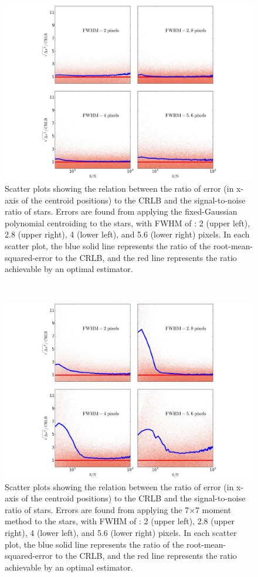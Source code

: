 \documentclass[onecolumn]{aastex61}
\newcommand{\todo}[1]{{\textcolor{dred}{ #1}}}
\begin{document}
\begin{figure}[p]~\\
\begin{center}
\includegraphics[width=0.85\linewidth]{new_polynomial.pdf}
\caption{\todo{Scatter plots showing the relation between the ratio of error (in x-axis of the centroid positions) to the CRLB and the signal-to-noise ratio of stars. 
Errors are found from applying the fixed-Gaussian polynomial centroiding to the stars,
with FWHM of : 2 (upper left), 2.8 (upper right), 4 (lower left), and 5.6 (lower right) pixels. In each scatter plot, the blue solid line represents the ratio of the root-mean-squared-error to the CRLB, and the red line represents the ratio achievable by an optimal estimator.}}\label{3}
\end{center}
\end{figure}

\begin{figure}[p]~\\
\begin{center}
\includegraphics[width=0.85\linewidth]{new_moment.pdf}
\caption{\todo{Scatter plots showing the relation between the ratio of error (in x-axis of the centroid positions) to the CRLB and the signal-to-noise ratio of stars. 
Errors are found from applying the 7$\times$7 moment method to the stars,
with FWHM of : 2 (upper left), 2.8 (upper right), 4 (lower left), and 5.6 (lower right) pixels. In each scatter plot, the blue solid line represents the ratio of the root-mean-squared-error to the CRLB, and the red line represents the ratio achievable by an optimal estimator.}}\label{4}
\end{center}
\end{figure}
\end{document}
